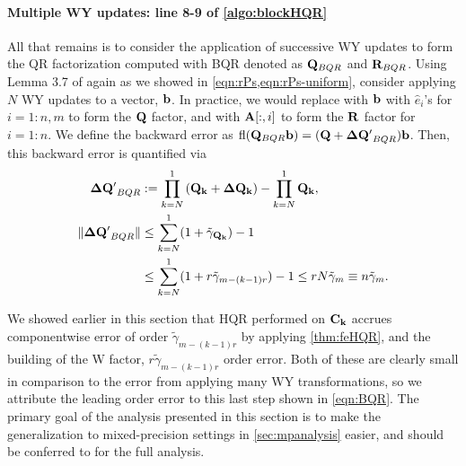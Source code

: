 \paragraph{Multiple WY updates: line 8-9 of \cref{algo:blockHQR}}
All that remains is to consider the application of successive WY updates to form the QR factorization computed with BQR denoted as $\mathbf{Q}_{BQR}$ and $\mathbf{R}_{BQR}$. 
Using Lemma 3.7 of \cite{Higham2002} again as we showed in \cref{eqn:rPs,eqn:rPs-uniform}, consider applying $N$ WY updates to a vector, $\mathbf{b}$. 
In practice, we would replace with $\mathbf{b}$ with $\hat{e}_i$'s for $i=1:n,m$ to form the $\mathbf{Q}$ factor, and with $\mathbf{A}[:,i]$ to form the $\mathbf{R}$ factor for $i=1:n$. 
We define the backward error as $\mathrm{fl}(\mathbf{Q}_{BQR}\mathbf{b}) = (\mathbf{Q} + \mathbf{\Delta Q'}_{BQR}) \mathbf{b}$.
Then, this backward error is quantified via
\begin{align}
\bb{\Delta Q'}_{BQR} &:= \prod_{k=N}^{1}\left(\bb{Q_k} +\bb{\Delta Q_k}\right) - \prod_{k=N}^{1}\bb{Q_k} ,\\
\|\bb{\Delta Q'}_{BQR}\| & \leq \sum_{k=N}^1 (1+\tilde{\gamma}_{\bb{Q_k}})  -1 \label{eqn:BQR-mp}\\
&\leq \sum_{k=N}^1 (1+ r\tilde{\gamma}_{m-(k-1)r})-1 \leq rN\tilde{\gamma}_m \equiv n\tilde{\gamma}_m \label{eqn:BQR}.
\end{align}

We showed earlier in this section that HQR performed on $\mathbf{C_k}$ accrues componentwise error of order $\tilde{\gamma}_{m-(k-1)r}$ by applying \cref{thm:feHQR}, and the building of the W factor, $r\tilde{\gamma}_{m-(k-1)r}$ order error.
Both of these are clearly small in comparison to the error from applying many WY transformations, so we attribute the leading order error to this last step shown in \cref{eqn:BQR}.
The primary goal of the analysis presented in this section is to make the generalization to mixed-precision settings in \cref{sec:mpanalysis} easier, and \cite{golub2013matrix,Higham2002} should be conferred to for the full analysis.